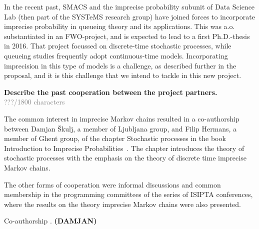 \documentclass[11pt,dvipsnames,usenames,a4paper]{article}
\begin{document}
In the recent past, SMACS and the imprecise probability subunit of Data Science Lab (then part of the SYSTeMS research group) have  joined forces to incorporate imprecise probability in queueing theory and its applications. This was a.o. substantiated in an FWO-project, and is expected to lead to a first Ph.D.-thesis in 2016. That project focussed on discrete-time stochastic processes, while queueing studies frequently adopt continuous-time models. Incorporating imprecision in this type of models is a challenge, as described further in the proposal, and it is this challenge that we intend to tackle in this new project.

\textbf{Describe the past cooperation between the project partners.}\\
\textcolor{Gray}{???/1800 characters}

The common interest in imprecise Markov chains resulted in a co-authorship between Damjan Škulj, a member of Ljubljana group, and Filip Hermans, a member of Ghent group, of the chapter Stochastic processes in the book Introduction to Imprecise Probabilities~\cite{augustin2013:itip}. The chapter introduces the theory of stochastic processes with the emphasis on the theory of discrete time imprecise Markov chains. 

The other forms of cooperation were informal discussions and common membership in the programming committees of the series of ISIPTA conferences, where the results on the theory imprecise Markov chains were also presented. 



Co-authorship . {\color{blue}\bf (DAMJAN)}








\end{document}
